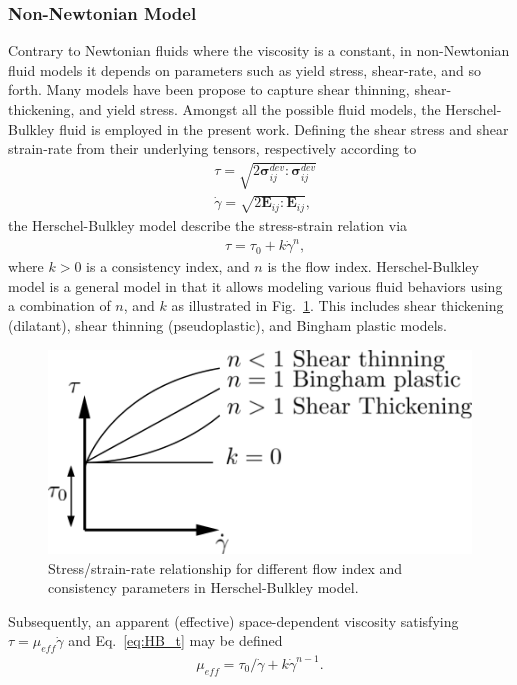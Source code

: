 \subsubsection*{Non-Newtonian Model}
Contrary to Newtonian fluids where the viscosity is a constant, in non-Newtonian fluid models it depends on parameters such as yield stress, shear-rate, and so forth. Many models have been propose to capture shear thinning, shear-thickening, and yield stress. Amongst all the possible fluid models, the Herschel-Bulkley fluid is employed in the present work. Defining the shear stress and shear strain-rate from their underlying tensors, respectively according to
\begin{align}
& \tau = \sqrt{2 \boldsymbol{\bm{\sigma}}^{dev}_{ij} : \boldsymbol{\bm {\sigma}}^{dev}_{ij}}\\
& \dot{\gamma} = \sqrt{2 {\boldsymbol E}_{ij} : {\boldsymbol E}_{ij}},
\end{align}
the Herschel-Bulkley model describe the stress-strain relation via  
\begin{align}
& \tau = \tau_0+k\dot{\gamma}^n,
\label{eq:HB_t}
\end{align}
where $k>0$ is a consistency index, and $n$ is the flow index. Herschel-Bulkley model is a general model in that it allows modeling various fluid behaviors using a combination of $n$, and $k$ as illustrated in Fig.~\ref{fig:HB}. This includes shear thickening (dilatant), shear thinning (pseudoplastic), and Bingham plastic models.
\begin{figure}[H]
	\begin{center}
		\includegraphics[width=.6\linewidth]{images/Non-newtonian.png}
	\end{center}
	\caption{Stress/strain-rate relationship for different flow index and consistency parameters in Herschel-Bulkley model.}
	\label{fig:HB}
\end{figure}
Subsequently, an apparent (effective) space-dependent viscosity satisfying $\tau = \mu_{eff}\dot{\gamma}$ and Eq.~\ref{eq:HB_t} may be defined \cite{WALLEVIK201495}
\begin{align}
\mu_{eff}= \tau_0/\dot{\gamma}+k \dot{\gamma}^{n-1}.
\label{eq:HB_mu}
\end{align}
